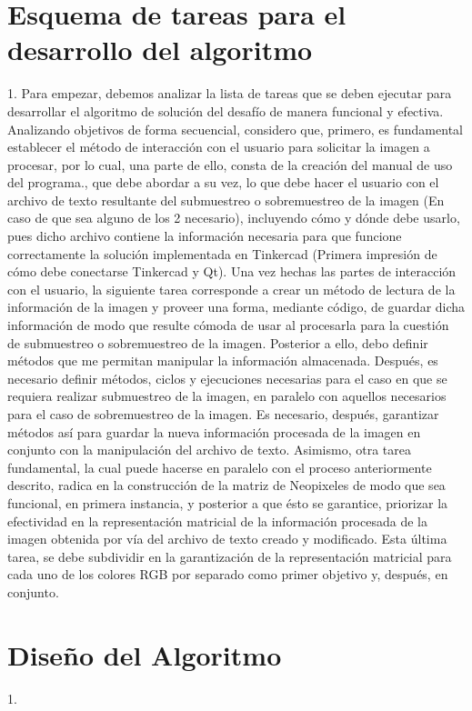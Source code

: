 \documentclass{article}
\begin{document}
\section{Esquema de tareas para el desarrollo del algoritmo} \label{contenido}
1. Para empezar, debemos analizar la lista de tareas que se deben ejecutar para desarrollar el algoritmo de solución del desafío de manera funcional y efectiva. Analizando objetivos de forma secuencial, considero que, primero, es fundamental establecer el método de interacción con el usuario para solicitar la imagen a procesar, por lo cual, una parte de ello, consta de la creación del manual de uso del programa., que debe abordar a su vez, lo que debe hacer el usuario con el archivo de texto resultante del submuestreo o sobremuestreo de la imagen (En caso de que sea alguno de los 2 necesario), incluyendo cómo y dónde debe usarlo, pues dicho archivo contiene la información necesaria para que funcione correctamente la solución implementada en Tinkercad (Primera impresión de cómo debe conectarse Tinkercad y Qt). Una vez hechas las partes de interacción con el usuario, la siguiente tarea corresponde a crear un método de lectura de la información de la imagen y proveer una forma, mediante código, de guardar dicha información de modo que resulte cómoda de usar al procesarla para la cuestión de submuestreo o sobremuestreo de la imagen. Posterior a ello, debo definir métodos que me permitan manipular la información almacenada. Después, es necesario definir métodos, ciclos y ejecuciones necesarias para el caso en que se requiera realizar submuestreo de la imagen, en paralelo con aquellos necesarios para el caso de sobremuestreo de la imagen. Es necesario, después, garantizar métodos así para guardar la nueva información procesada de la imagen en conjunto con la manipulación del archivo de texto. Asimismo, otra tarea fundamental, la cual puede hacerse en paralelo con el proceso anteriormente descrito, radica en la construcción de la matriz de Neopixeles de modo que sea funcional, en primera instancia, y posterior a que ésto se garantice, priorizar la efectividad en la representación matricial de la información procesada de la imagen obtenida por vía del archivo de texto creado y modificado. Esta última tarea, se debe subdividir en la garantización de la representación matricial para cada uno de los colores RGB por separado como primer objetivo y, después, en conjunto.


\section{Diseño del Algoritmo} \label{contenido}
1. 
\newline
\end{document}
